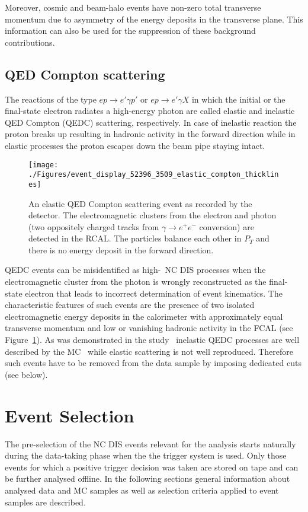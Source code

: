 Moreover, cosmic and beam-halo events have non-zero total transverse momentum due to asymmetry of the energy deposits in the transverse plane. This information can also be used for the suppression of these background contributions. 

\subsection{QED Compton scattering}
The reactions of the type $ep \rightarrow e' \gamma p'$ or $ep \rightarrow e'\gamma X$ in which the initial or the final-state electron radiates a high-energy photon are called elastic and inelastic QED Compton (QEDC) scattering, respectively. In case of inelastic reaction the proton breaks up resulting in hadronic activity in the forward direction while in elastic processes the proton escapes down the beam pipe staying intact. 
\begin{figure}[htbp]
	\centering
	\texttt{[image: ./Figures/event\_display\_52396\_3509\_elastic\_compton\_thicklines]} 
	\caption{An elastic QED Compton scattering event as recorded by the \zeus detector. The electromagnetic clusters from the electron and photon (two oppositely charged tracks from $\gamma \rightarrow e^+e^-$ conversion) are detected in the RCAL. The particles balance each other in $P_T$ and there is no energy deposit in the forward direction.}
	\label{fig:qedceventdisplay}
\end{figure}

QEDC events can be misidentified as high-\qsq~NC DIS processes when the electromagnetic cluster from the photon is wrongly reconstructed as the final-state electron that leads to incorrect determination of event kinematics. The characteristic features of such events are the presence of two isolated electromagnetic energy deposits in the calorimeter with approximately equal transverse momentum and low or vanishing hadronic activity in the FCAL (see Figure~\ref{fig:qedceventdisplay}). As was demonstrated in the study~\cite{thesis:moritz:2001} inelastic QEDC processes are well described by the \djangoh MC~\cite{cpc:81:381} while elastic scattering is not well reproduced. Therefore such events have to be removed from the data sample by imposing dedicated cuts (see below).

\section{Event Selection}
The pre-selection of the NC DIS events relevant for the analysis starts naturally during the data-taking phase when the the \zeus trigger system is used. Only those events for which a positive trigger decision was taken are stored on tape and can be further analysed offline. In the following sections general information about analysed data and MC samples as well as selection criteria applied to event samples are described.

